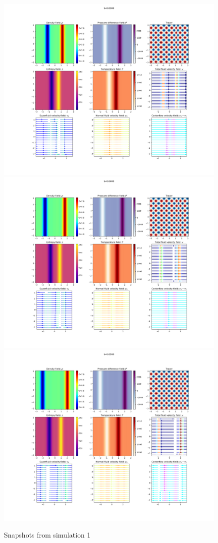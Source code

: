 \documentclass{article}
\begin{document}
\begin{figure}[h]
    \includegraphics[width=\textwidth/2]{Sim 1/SF01_0060.png}
    \includegraphics[width=\textwidth/2]{Sim 1/SF01_0080.png}
    \includegraphics[width=\textwidth/2]{Sim 1/SF01_0100.png}
    \caption{Snapshots from simulation 1}
    \label{sim1}
\end{figure}
\end{document}

